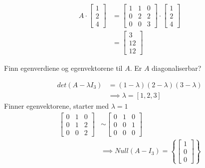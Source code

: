 \documentclass[11pt, a4paper, norsk]{NTNUoving}
\begin{document}
\begin{oppgave}
\begin{punkt}
            \begin{align*}
                A \cdot \begin{bmatrix}
                    1 \\
                    2 \\
                    4
                \end{bmatrix} &= \begin{bmatrix}
                1 & 1 & 0 \\
                0 & 2 & 2 \\
                0 & 0 & 3
                \end{bmatrix} \cdot \begin{bmatrix}
                    1 \\
                    2 \\
                    4
                \end{bmatrix}
                \\
                &= \begin{bmatrix}
                    3 \\
                    12 \\
                    12
                \end{bmatrix}
            \end{align*}
        \end{punkt}
        \begin{punkt}
            Finn egenverdiene og egenvektorene til $A$. Er $A$ diagonaliserbar?

            \begin{align*}
                det(A - \lambda I_3) &= (1-\lambda)(2-\lambda)(3-\lambda)
                \\
                                     &\implies \lambda = [1, 2, 3]
            \end{align*}
            Finner egenvektorene, starter med $\lambda = 1$
            \begin{align*}
                \begin{bmatrix}
                    0 & 1 & 0 \\
                    0 & 1 & 2 \\
                    0 & 0 & 2
                \end{bmatrix} &\sim \begin{bmatrix}
                0 & 1 & 0 \\
                0 & 0 & 1 \\
                0 & 0 & 0
                \end{bmatrix}
                \\
                &\implies Null(A - I_3) = \left\{\begin{bmatrix}
                    1 \\
                    0 \\
                    0
                \end{bmatrix}\right\}
            \end{align*}
            

\end{punkt}
\end{oppgave}
\end{document}
